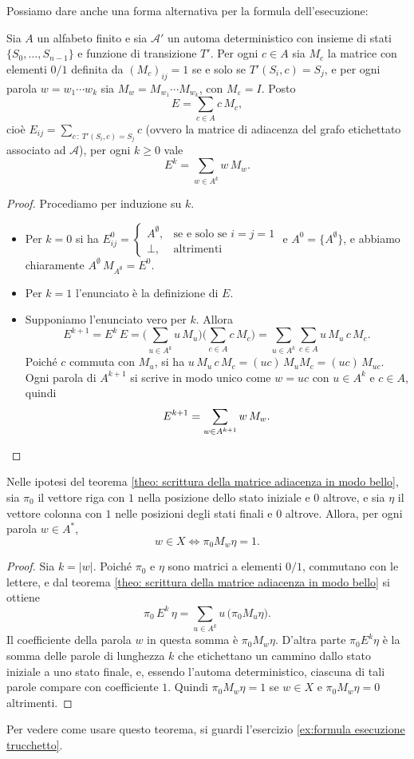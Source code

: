 Possiamo dare anche una forma alternativa
per la formula dell'esecuzione:
\begin{theo}\label{theo: scrittura della matrice adiacenza in modo bello}
Sia $A$ un alfabeto finito e sia $\mathcal{A}'$ un automa deterministico con insieme di stati $\{S_0,\dots,S_{n-1}\}$ e funzione di transizione $T'$.
Per ogni $c\in A$ sia $M_c$ la matrice con elementi $0/1$ definita da $(M_c)_{ij}=1$ se e solo se $T'(S_i,c)=S_j$, e per ogni parola $w=w_1\cdots w_k$ sia $M_w=M_{w_1}\cdots M_{w_k}$, con $M_\varepsilon=I$.
Posto
\[
E=\sum_{c\in A}c\,M_c,
\]
cioè $E_{ij}=\sum_{c\,:\,T'(S_i,c)=S_j}c$ (ovvero la matrice di adiacenza del grafo etichettato associato ad $\mathcal A$), per ogni $k\ge 0$ vale
\[
E^k=\sum_{w\in A^k}w\,M_w .
\]
\end{theo}

\begin{proof}
Procediamo per induzione su $k$.
\begin{itemize}
\item Per $k=0$ si ha $E^0_{ij}=\begin{cases}
A^{\emptyset}, & \text{se e solo se } i=j=1
\\
\bot, & \text{altrimenti}  
\end{cases}$ e $A^0=\{A^{\emptyset}\}$, e abbiamo chiaramente $A^{\emptyset}\,M_{A^{\emptyset}}=E^0$.
\item Per $k=1$ l'enunciato è la definizione di $E$.
\item Supponiamo l'enunciato vero per $k$. Allora
\[
E^{k+1}=E^k\,E=\Big(\sum_{u\in A^k}u\,M_u\Big)\Big(\sum_{c\in A}c\,M_c\Big)
=\sum_{u\in A^k}\sum_{c\in A}u\,M_u\,c\,M_c .
\]
Poiché $c$ commuta con $M_u$, si ha $u\,M_u\,c\,M_c=(uc)\,M_uM_c=(uc)\,M_{uc}$.
Ogni parola di $A^{k+1}$ si scrive in modo unico come $w=uc$ con $u\in A^k$ e $c\in A$, quindi
\[
E^{k+1}=\sum_{w\in A^{k+1}}w\,M_w. \qedhere
\]
\end{itemize}
\end{proof}

\begin{coro}
Nelle ipotesi del teorema \ref{theo: scrittura della matrice adiacenza in modo bello}, sia $\pi_0$ il vettore riga con $1$ nella posizione dello stato iniziale e $0$ altrove, e sia $\eta$ il vettore colonna con $1$ nelle posizioni degli stati finali e $0$ altrove. Allora, per ogni parola $w\in A^*$,
\[
w\in X \iff \pi_0 M_w\eta=1 .
\]
\end{coro}

\begin{proof}
Sia $k=|w|$. Poiché $\pi_0$ e $\eta$ sono matrici a elementi $0/1$, commutano con le lettere, e dal teorema \ref{theo: scrittura della matrice adiacenza in modo bello} si ottiene
\[
\pi_0\,E^k\,\eta=\sum_{u\in A^k}u\,\big(\pi_0M_u\eta\big).
\]
Il coefficiente della parola $w$ in questa somma è $\pi_0M_w\eta$. D'altra parte $\pi_0E^k\eta$ è la somma delle parole di lunghezza $k$ che etichettano un cammino dallo stato iniziale a uno stato finale, e, essendo l'automa deterministico, ciascuna di tali parole compare con coefficiente $1$. Quindi $\pi_0M_w\eta=1$ se $w\in X$ e $\pi_0M_w\eta=0$ altrimenti.
\end{proof}
Per vedere come usare questo teorema, si guardi l'esercizio \ref{ex:formula esecuzione trucchetto}.